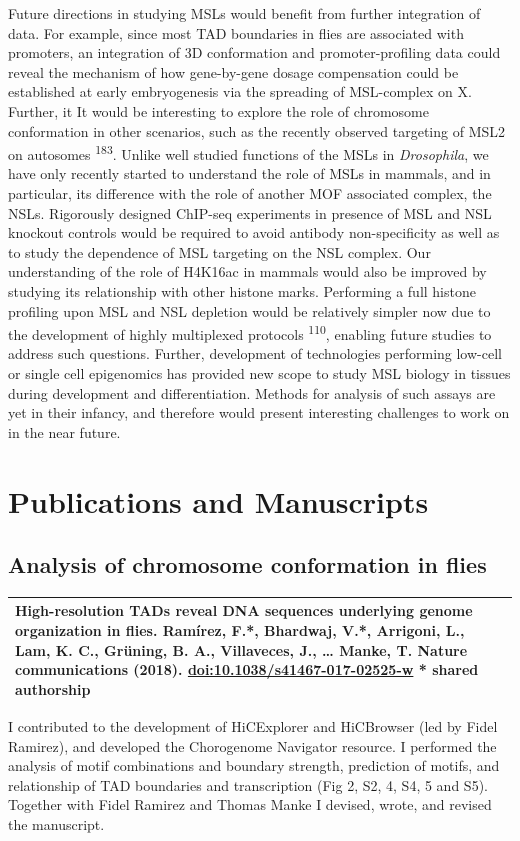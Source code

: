 \documentclass[11pt,twoside]{MPIthesis}
\theoremstyle{definition}
\theoremstyle{definition}
\theoremstyle{definition}
\theoremstyle{remark}
\begin{document}
Future directions in studying MSLs would benefit from further
integration of data. For example, since most TAD boundaries in flies are
associated with promoters, an integration of 3D conformation and
promoter-profiling data could reveal the mechanism of how gene-by-gene
dosage compensation could be established at early embryogenesis via the
spreading of MSL-complex on X. Further, it It would be interesting to
explore the role of chromosome conformation in other scenarios, such as
the recently observed targeting of MSL2 on autosomes
\textsuperscript{183}. Unlike well studied functions of the MSLs in
\emph{Drosophila}, we have only recently started to understand the role
of MSLs in mammals, and in particular, its difference with the role of
another MOF associated complex, the NSLs. Rigorously designed ChIP-seq
experiments in presence of MSL and NSL knockout controls would be
required to avoid antibody non-specificity as well as to study the
dependence of MSL targeting on the NSL complex. Our understanding of the
role of H4K16ac in mammals would also be improved by studying its
relationship with other histone marks. Performing a full histone
profiling upon MSL and NSL depletion would be relatively simpler now due
to the development of highly multiplexed protocols
\textsuperscript{110}, enabling future studies to address such
questions. Further, development of technologies performing low-cell or
single cell epigenomics has provided new scope to study MSL biology in
tissues during development and differentiation. Methods for analysis of
such assays are yet in their infancy, and therefore would present
interesting challenges to work on in the near future.

\appendix

\chapter{Publications and
Manuscripts}\label{publications-and-manuscripts}

\section{Analysis of chromosome conformation in
flies}\label{analysis-of-chromosome-conformation-in-flies}
\begin{longtable}[]{@{}l@{}}
\toprule
\begin{minipage}[t]{0.97\columnwidth}\raggedright\strut
\textbf{High-resolution TADs reveal DNA sequences underlying genome
organization in flies.} Ramírez, F.*, \textbf{Bhardwaj, V.*}, Arrigoni,
L., Lam, K. C., Grüning, B. A., Villaveces, J., \ldots{} Manke, T.
\textbf{Nature communications (2018)}.
\url{doi:10.1038/s41467-017-02525-w} * shared authorship\strut
\end{minipage}\tabularnewline
\bottomrule
\end{longtable}
I contributed to the development of HiCExplorer and HiCBrowser (led by
Fidel Ramirez), and developed the Chorogenome Navigator resource. I
performed the analysis of motif combinations and boundary strength,
prediction of motifs, and relationship of TAD boundaries and
transcription (Fig 2, S2, 4, S4, 5 and S5). Together with Fidel Ramirez
and Thomas Manke I devised, wrote, and revised the manuscript.
\end{document}
